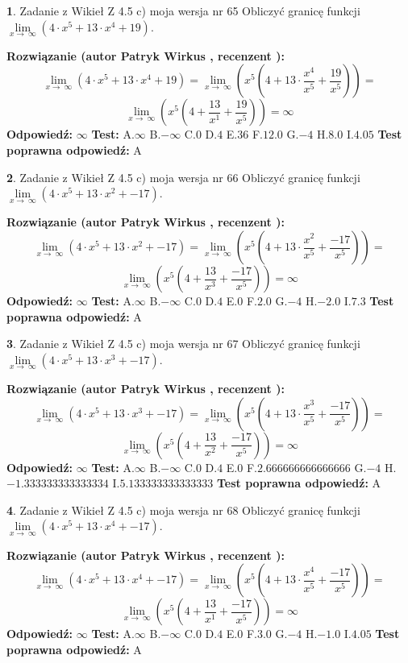 \documentclass[12pt, a4paper]{article}
\theoremstyle{definition} %
\newtheorem{zad}{}
\newcommand{\zadStart}[1]{\begin{zad}#1\newline}
\newcommand{\zadStop}{\end{zad}}
\newcommand{\rozwStart}[2]{\noindent \textbf{Rozwiązanie (autor #1 , recenzent #2): }\newline}
\newcommand{\rozwStop}{\newline}
\newcommand{\odpStart}{\noindent \textbf{Odpowiedź:}\newline}
\newcommand{\odpStop}{\newline}
\newcommand{\testStart}{\noindent \textbf{Test:}\newline}
\newcommand{\testStop}{\newline}
\newcommand{\kluczStart}{\noindent \textbf{Test poprawna odpowiedź:}\newline}
\newcommand{\kluczStop}{\newline}
\begin{document}
\zadStart{Zadanie z Wikieł Z 4.5 c) moja wersja nr 65}
Obliczyć granicę funkcji  $\lim\limits_{x\to\ \infty}(4 \cdot x^{5}+13 \cdot x^{4}+19)$.
\zadStop
\rozwStart{Patryk Wirkus}{}
$$\lim\limits_{x\to\ \infty}(4 \cdot x^{5}+13 \cdot x^{4}+19) = \lim\limits_{x\to\ \infty}(x^{5}(4 +13 \cdot \frac{x^{4}}{x^{5}}+\frac{19}{x^{5}})) =$$ $$\lim\limits_{x\to\ \infty}(x^{5}(4 +\frac{13}{x^{1}}+\frac{19}{x^{5}})) =\infty$$
\rozwStop
\odpStart
$\infty$
\odpStop
\testStart
A.$\infty$ B.$-\infty$ C.$0$ D.$4$ E.$36$
F.$12.0$ G.$-4$
H.$8.0$
I.$4.05$
\testStop
\kluczStart
A
\kluczStop



\zadStart{Zadanie z Wikieł Z 4.5 c) moja wersja nr 66}
Obliczyć granicę funkcji  $\lim\limits_{x\to\ \infty}(4 \cdot x^{5}+13 \cdot x^{2}+-17)$.
\zadStop
\rozwStart{Patryk Wirkus}{}
$$\lim\limits_{x\to\ \infty}(4 \cdot x^{5}+13 \cdot x^{2}+-17) = \lim\limits_{x\to\ \infty}(x^{5}(4 +13 \cdot \frac{x^{2}}{x^{5}}+\frac{-17}{x^{5}})) =$$ $$\lim\limits_{x\to\ \infty}(x^{5}(4 +\frac{13}{x^{3}}+\frac{-17}{x^{5}})) =\infty$$
\rozwStop
\odpStart
$\infty$
\odpStop
\testStart
A.$\infty$ B.$-\infty$ C.$0$ D.$4$ E.$0$
F.$2.0$ G.$-4$
H.$-2.0$
I.$7.3$
\testStop
\kluczStart
A
\kluczStop



\zadStart{Zadanie z Wikieł Z 4.5 c) moja wersja nr 67}
Obliczyć granicę funkcji  $\lim\limits_{x\to\ \infty}(4 \cdot x^{5}+13 \cdot x^{3}+-17)$.
\zadStop
\rozwStart{Patryk Wirkus}{}
$$\lim\limits_{x\to\ \infty}(4 \cdot x^{5}+13 \cdot x^{3}+-17) = \lim\limits_{x\to\ \infty}(x^{5}(4 +13 \cdot \frac{x^{3}}{x^{5}}+\frac{-17}{x^{5}})) =$$ $$\lim\limits_{x\to\ \infty}(x^{5}(4 +\frac{13}{x^{2}}+\frac{-17}{x^{5}})) =\infty$$
\rozwStop
\odpStart
$\infty$
\odpStop
\testStart
A.$\infty$ B.$-\infty$ C.$0$ D.$4$ E.$0$
F.$2.666666666666666$ G.$-4$
H.$-1.333333333333334$
I.$5.133333333333333$
\testStop
\kluczStart
A
\kluczStop



\zadStart{Zadanie z Wikieł Z 4.5 c) moja wersja nr 68}
Obliczyć granicę funkcji  $\lim\limits_{x\to\ \infty}(4 \cdot x^{5}+13 \cdot x^{4}+-17)$.
\zadStop
\rozwStart{Patryk Wirkus}{}
$$\lim\limits_{x\to\ \infty}(4 \cdot x^{5}+13 \cdot x^{4}+-17) = \lim\limits_{x\to\ \infty}(x^{5}(4 +13 \cdot \frac{x^{4}}{x^{5}}+\frac{-17}{x^{5}})) =$$ $$\lim\limits_{x\to\ \infty}(x^{5}(4 +\frac{13}{x^{1}}+\frac{-17}{x^{5}})) =\infty$$
\rozwStop
\odpStart
$\infty$
\odpStop
\testStart
A.$\infty$ B.$-\infty$ C.$0$ D.$4$ E.$0$
F.$3.0$ G.$-4$
H.$-1.0$
I.$4.05$
\testStop
\kluczStart
A
\kluczStop
\end{document}
